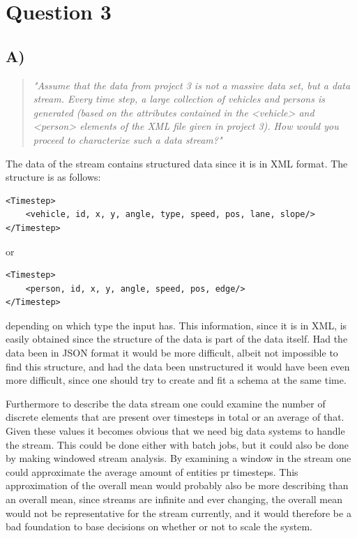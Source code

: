 \section{Question 3}

\subsection{A)}
\begin{quote}
	\textit{"Assume	that	the	data	from	project	3	is	not	a	massive	data	set,	but	a	data	stream.	Every	time	step,	a	large	collection	of	vehicles	and	persons	is	generated	(based	on	the	attributes	contained	in	the	<vehicle>	and	<person>	elements	of	the	XML	file	given	in	project	3).	How	would	you	proceed	to	characterize	such	a	data	stream?"}
\end{quote}
The data of the stream contains structured data since it is in XML format. The structure is as follows:
\begin{verbatim}
<Timestep>
    <vehicle, id, x, y, angle, type, speed, pos, lane, slope/>
</Timestep>
\end{verbatim}
or 
\begin{verbatim}
<Timestep>
    <person, id, x, y, angle, speed, pos, edge/>
</Timestep>
\end{verbatim}
depending on which type the input has. This information, since it is in XML, is easily obtained since the structure of the data is part of the data itself. Had the data been in JSON format it would be more difficult, albeit not impossible to find this structure, and had the data been unstructured it would have been even more difficult, since one should try to create and fit a schema at the same time.

Furthermore to describe the data stream one could examine the number of discrete elements that are present over timesteps in total or an average of that. Given these values it becomes obvious that we need big data systems to handle the stream. This could be done either with batch jobs, but it could also be done by making windowed stream analysis. By examining a window in the stream one could approximate the average amount of entities pr timesteps. This approximation of the overall mean would probably also be more describing than an overall mean, since streams are infinite and ever changing, the overall mean would not be representative for the stream currently, and it would therefore be a bad foundation to base decisions on whether or not to scale the system.

